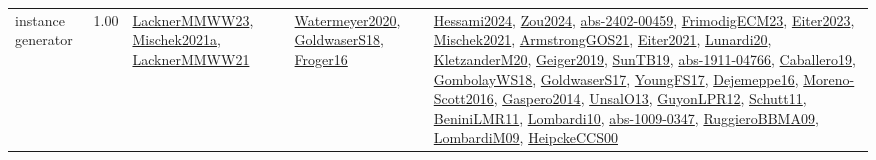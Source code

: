 {\begin{longtable}{p{3cm}r>{\raggedright\arraybackslash}p{6cm}>{\raggedright\arraybackslash}p{6cm}>{\raggedright\arraybackslash}p{8cm}}
\index{instance generator}\index{Benchmarks!instance generator}instance generator &  1.00 & \hyperref[detail:LacknerMMWW23]{LacknerMMWW23}, \hyperref[detail:Mischek2021a]{Mischek2021a}, \hyperref[detail:LacknerMMWW21]{LacknerMMWW21} & \hyperref[detail:Watermeyer2020]{Watermeyer2020}, \hyperref[detail:GoldwaserS18]{GoldwaserS18}, \hyperref[detail:Froger16]{Froger16} & \hyperref[detail:Hessami2024]{Hessami2024}, \hyperref[detail:Zou2024]{Zou2024}, \hyperref[detail:abs-2402-00459]{abs-2402-00459}, \hyperref[detail:FrimodigECM23]{FrimodigECM23}, \hyperref[detail:Eiter2023]{Eiter2023}, \hyperref[detail:Mischek2021]{Mischek2021}, \hyperref[detail:ArmstrongGOS21]{ArmstrongGOS21}, \hyperref[detail:Eiter2021]{Eiter2021}, \hyperref[detail:Lunardi20]{Lunardi20}, \hyperref[detail:KletzanderM20]{KletzanderM20}, \hyperref[detail:Geiger2019]{Geiger2019}, \hyperref[detail:SunTB19]{SunTB19}, \hyperref[detail:abs-1911-04766]{abs-1911-04766}, \hyperref[detail:Caballero19]{Caballero19}, \hyperref[detail:GombolayWS18]{GombolayWS18}, \hyperref[detail:GoldwaserS17]{GoldwaserS17}, \hyperref[detail:YoungFS17]{YoungFS17}, \hyperref[detail:Dejemeppe16]{Dejemeppe16}, \hyperref[detail:Moreno-Scott2016]{Moreno-Scott2016}, \hyperref[detail:Gaspero2014]{Gaspero2014}, \hyperref[detail:UnsalO13]{UnsalO13}, \hyperref[detail:GuyonLPR12]{GuyonLPR12}, \hyperref[detail:Schutt11]{Schutt11}, \hyperref[detail:BeniniLMR11]{BeniniLMR11}, \hyperref[detail:Lombardi10]{Lombardi10}, \hyperref[detail:abs-1009-0347]{abs-1009-0347}, \hyperref[detail:RuggieroBBMA09]{RuggieroBBMA09}, \hyperref[detail:LombardiM09]{LombardiM09}, \hyperref[detail:HeipckeCCS00]{HeipckeCCS00}\\

\end{longtable}}

